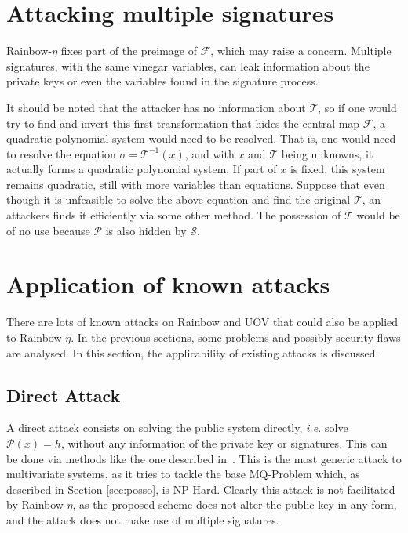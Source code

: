 \documentclass{ufsctex/ufsctex}
\begin{document}
\section{Attacking multiple signatures}

Rainbow-$\eta$ fixes part of the preimage of $\mathcal{F}$, which may raise a
concern. Multiple signatures, with the same vinegar variables, can leak
information about the private keys or even the variables found in the signature
process.

It should be noted that the attacker has no information about $\mathcal{T}$, so
if one would try to find and invert this first transformation that hides the
central map $\mathcal{F}$, a quadratic polynomial system would need to be
resolved. That is, one would need to resolve the equation $\sigma =
\mathcal{T}^{-1}(x)$, and with $x$ and $\mathcal{T}$ being unknowns, it
actually forms a quadratic polynomial system. If part of $x$ is fixed, this
system remains quadratic, still with more variables than equations. Suppose
that even though it is unfeasible to solve the above equation and find the
original $\mathcal{T}$, an attackers finds it efficiently via some other
method. The possession of $\mathcal{T}$ would be of no use because
$\mathcal{P}$ is also hidden by $\mathcal{S}$.

\section{Application of known attacks}

There are lots of known attacks on Rainbow and UOV that could also be applied
to Rainbow-$\eta$. In the previous sections, some problems and possibly
security flaws are analysed. In this section, the applicability of existing
attacks is discussed.

\subsection{Direct Attack}

A direct attack consists on solving the public system directly, \textit{i.e.}
solve $\mathcal{P}(x) = h$, without any information of the private key or
signatures. This can be done via methods like the one described
in~\cite{bettale2009hybrid}. This is the most generic attack to multivariate
systems, as it tries to tackle the base MQ-Problem which, as described in
Section \ref{sec:posso}, is NP-Hard. Clearly this attack is not facilitated by
Rainbow-$\eta$, as the proposed scheme does not alter the public key in any
form, and the attack does not make use of multiple signatures.
\end{document}
